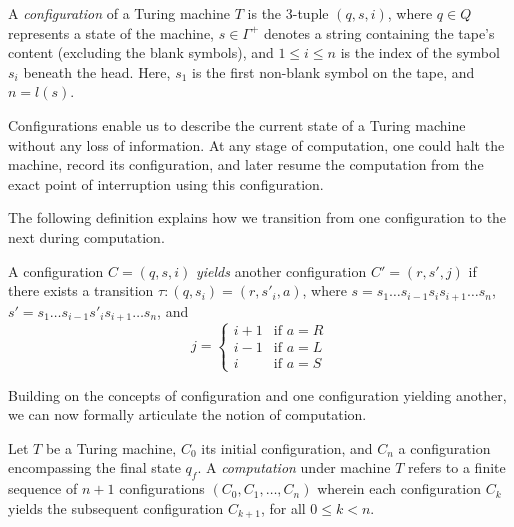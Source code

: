 \begin{definition}
A \emph{configuration} of a Turing machine $T$ is the 3-tuple $\left(q,s,i\right)$, where $q\in Q$ represents a state of the machine, $s\in\Gamma^+$ denotes a string containing the tape's content (excluding the blank symbols), and $1 \le i \le n$ is the index of the symbol $s_i$ beneath the head. Here, $s_1$ is the first non-blank symbol on the tape, and $n=l(s)$. 
\end{definition}

Configurations enable us to describe the current state of a Turing machine without any loss of information. At any stage of computation, one could halt the machine, record its configuration, and later resume the computation from the exact point of interruption using this configuration.

The following definition explains how we transition from one configuration to the next during computation.

\begin{definition}
A configuration $C=\left(q,s,i\right)$ \emph{yields} another configuration $C'=\left(r,s',j\right)$ if there exists a transition $\tau:\left(q, s_{i}\right) = \left(r, s'_{i}, a\right)$, where $s=s_{1} \dots s_{i-1}s_{i}s_{i+1} \dots s_{n}$, $s'=s_{1} \dots s_{i-1}s'_{i}s_{i+1} \dots s_{n}$, and
\begin{equation}
  j = \begin{cases}
        i+1 & \text{if $a=R$} \\
        i-1 & \text{if $a=L$} \\
        i   & \text{if $a=S$}
  \end{cases}
\end{equation}
\end{definition}

Building on the concepts of configuration and one configuration yielding another, we can now formally articulate the notion of computation.

\begin{definition}[Computation]
Let $T$ be a Turing machine, $C_{0}$ its initial configuration, and $C_n$ a configuration encompassing the final state $q_f$. A \emph{computation} under machine $T$ refers to a finite sequence of $n+1$ configurations $\left(C_{0},C_{1},\ldots,C_n\right)$ wherein each configuration $C_{k}$ yields the subsequent configuration $C_{k+1}$, for all $0\leq k < n$.
\end{definition}

